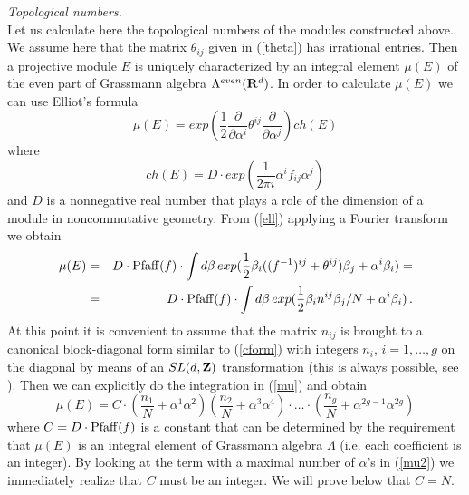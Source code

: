 \documentclass[a4paper,a4paper]{article}
\begin{document}

{\it Topological numbers.}\\
Let us calculate here the topological numbers of the modules constructed above.
We assume here that the matrix $\theta_{ij}$ given in  (\ref{theta}) has irrational entries. Then a  
projective module $E$ is uniquely characterized by an integral element $\mu(E)$ of the even part of  Grassmann algebra 
$\Lambda^{even}({\bf R}^{d})$.  
In order to calculate $\mu(E)$ we can use  Elliot's formula
\begin{equation} \label{ell}
\mu(E) = exp\left( \frac{1}{2}\frac{\partial}{\partial \alpha^{i}} \theta^{ij}   \frac{\partial}{\partial \alpha^{j}} \right) ch(E) 
\end{equation}
where 
\begin{equation}\label{ch}
ch(E) = D\cdot  exp(\frac{1}{2\pi i} \alpha^{i} f_{ij} \alpha^{j}  ) 
\end{equation}
and $D$ is a nonnegative real number that plays a role of the dimension of a module in noncommutative geometry.  
From (\ref{ell}) applying a Fourier transform we obtain
\begin{eqnarray} \label{mu}
\mu(E) &=& D\cdot {\rm Pfaff}(f) \cdot \int d\beta \, 
exp( \frac{1}{2}\beta_{i} ((f^{-1})^{ij} + \theta^{ij})\beta_{j} + \alpha^{i}\beta_{i}) = \nonumber \\
&=&   D\cdot {\rm Pfaff}(f)  \cdot \int d\beta \, exp(\frac{1}{2}\beta_{i} n^{ij} \beta_{j} /N  + \alpha^{i}\beta_{i}) \, .
\end{eqnarray}
At this point it is convenient to assume that the matrix $n_{ij}$ is brought 
to a canonical block-diagonal 
form similar to (\ref{cform}) with integers $n_{i}$, $i=1,\dots, g$ on the diagonal  by means of an $SL(d, {\bf Z})$ transformation 
(this is always possible, see \cite{Igusa}). 
Then we can explicitly do the integration in (\ref{mu}) and obtain 
\begin{equation}\label{mu2}
\mu(E) = C\cdot \left(\frac{n_{1}}{N} + \alpha^{1}\alpha^{2}\right) \left(\frac{n_{2}}{N} + \alpha^{3}\alpha^{4}\right)\cdot \dots 
\cdot \left(\frac{n_{g}}{N} + \alpha^{2g-1}\alpha^{2g}\right)
\end{equation}
where $C=D\cdot {\rm Pfaff}(f) $ is a constant that can be determined by the requirement that $\mu(E)$ is an integral element 
of Grassmann algebra $\Lambda$ (i.e. each coefficient  is an integer). By looking at the term with a maximal number 
 of $\alpha$'s in (\ref{mu2}) we immediately realize that $C$ must be an integer.   We will prove below that $C=N$.
\end{document}
